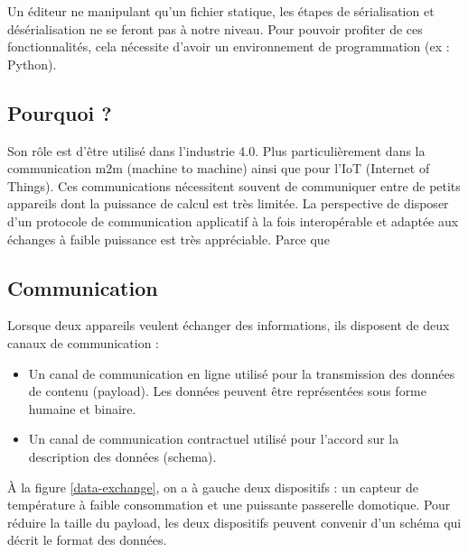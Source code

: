 \documentclass[
    iict, %
    il, %
]{heig-tb}
\begin{document}
Un éditeur ne manipulant qu'un fichier statique, les étapes de sérialisation et désérialisation ne se feront pas à notre niveau.
Pour pouvoir profiter de ces fonctionnalités, cela nécessite d'avoir un environnement de programmation (ex : Python).



\subsection{Pourquoi ?}
Son rôle est d'être utilisé dans l'industrie 4.0. Plus particulièrement dans la communication m2m (machine to machine) ainsi que pour l'IoT (Internet of Things).
Ces communications nécessitent souvent de communiquer entre de petits appareils dont la puissance de calcul est très limitée.
La perspective de disposer d'un protocole de communication applicatif à la fois interopérable et adaptée aux échanges à faible puissance est très appréciable.
Parce que %

\subsection{Communication}
Lorsque deux appareils veulent échanger des informations, ils disposent de deux canaux de communication :
\begin{itemize}
    \item Un canal de communication en ligne utilisé pour la transmission des données de contenu (payload). Les données peuvent être représentées sous forme humaine et binaire.
    \item Un canal de communication contractuel utilisé pour l'accord sur la description des données (schema).
\end{itemize}

\vspace{\parskip}

À la figure \ref*{data-exchange}, on a à gauche deux dispositifs : un capteur de température à faible consommation
et une puissante passerelle domotique. Pour réduire la taille du payload, les deux dispositifs peuvent convenir d'un schéma qui décrit le format des données.
\end{document}
